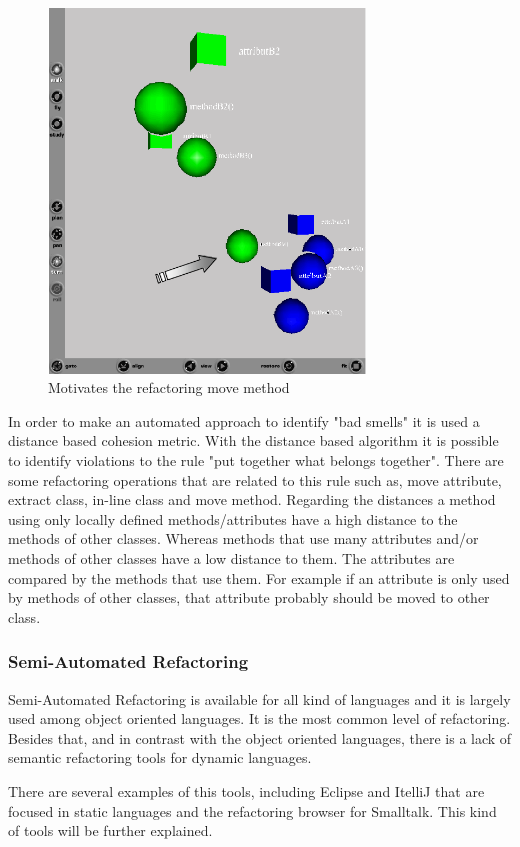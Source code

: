 \begin{figure}[h!]
  \centering
  \includegraphics[width=0.75\textwidth]{img/metricsbasedrefactoring.png}
  \caption{Motivates the refactoring move method}
  \label{fig:MetricsBasedRefactoring}
\end{figure}

In order to make an automated approach to identify "bad smells" it is used a distance based cohesion metric.
With the distance based algorithm it is possible to identify violations to the rule "put together what belongs together". 
There are some refactoring operations that are related to this rule such as, move attribute, extract class, in-line class and move method. 
Regarding the distances a method using only locally defined methods/attributes have a high distance to the methods of other classes. 
Whereas methods that use many attributes and/or methods of other classes have a low distance to them. 
The attributes are compared by the methods that use them. 
For example if an attribute is only used by methods of other classes, that attribute probably should be moved to other class.

\subsubsection{Semi-Automated Refactoring}

Semi-Automated Refactoring is available for all kind of languages and it is largely used among object oriented languages.
It is the most common level of refactoring.
Besides that, and in contrast with the object oriented languages, there is a lack of semantic refactoring tools for dynamic languages.

There are several examples of this tools, including Eclipse and ItelliJ that are focused in static languages and the refactoring browser for Smalltalk.
This kind of tools will be further explained. 

